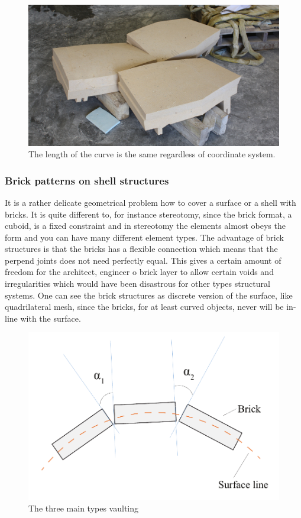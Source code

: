 \begin{figure}[H]
\centering
\includegraphics[height=0.4\linewidth ]{figure/Introduction/blockStereo.jpg}
\caption{The length of the curve is the same regardless of coordinate system.}
\end{figure}


\subsubsection{Brick patterns on shell structures} \label{sec:brickPatt}

It is a rather delicate geometrical problem how to cover a surface or a shell with bricks. It is quite  different to, for instance stereotomy,  since the brick format, a cuboid, is a fixed constraint and in stereotomy the elements almost obeys the form and you can have many different element types. The advantage of brick structures  is that the bricks has a flexible connection which means that the perpend joints does not need perfectly equal. This gives a certain amount of freedom for the architect, engineer o brick layer to allow certain voids and irregularities which would have been disastrous for other types structural systems. One can see the brick structures as discrete version of the surface, like quadrilateral mesh, since the bricks, for at least curved objects, never will be in-line with the surface. 
\begin{figure}[H]
\centering
\includegraphics[width=0.8\linewidth ]{figure/Introduction/brickgeo2.pdf}
\caption{The three main types vaulting}
\end{figure}

